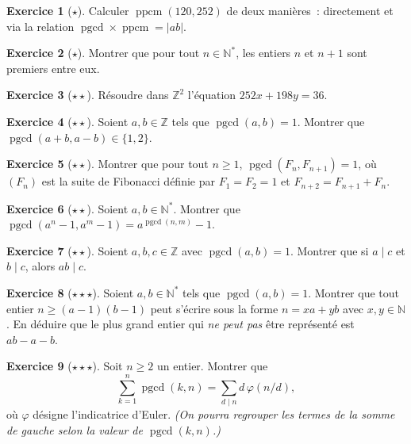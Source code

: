 \documentclass[12pt,a4paper,openany]{book}
\theoremstyle{definition}
\newtheorem{exercice}{Exercice}[chapter]
\theoremstyle{plain}
\theoremstyle{remark}
\newcommand{\N}{\mathbb{N}}
\newcommand{\Z}{\mathbb{Z}}
\newcommand{\abs}[1]{\left|#1\right|}
\DeclareMathOperator{\pgcd}{pgcd}
\DeclareMathOperator{\ppcm}{ppcm}
\begin{document}
\begin{exercice}[$\star$]
\label{exo:ch1:ppcm_calculs}
Calculer $\ppcm(120, 252)$ de deux manières~: directement et via la relation
$\pgcd \times \ppcm = \abs{ab}$.
\end{exercice}

\begin{exercice}[$\star$]
\label{exo:ch1:copremiers}
Montrer que pour tout $n \in \N^*$, les entiers $n$ et $n+1$ sont premiers entre
eux.
\end{exercice}

\begin{exercice}[$\star\star$]
\label{exo:ch1:bezout_equation}
Résoudre dans $\Z^2$ l'équation $252x + 198y = 36$.
\end{exercice}

\begin{exercice}[$\star\star$]
\label{exo:ch1:div_combinaison}
Soient $a, b \in \Z$ tels que $\pgcd(a,b) = 1$. Montrer que
$\pgcd(a+b, a-b) \in \{1, 2\}$.
\end{exercice}

\begin{exercice}[$\star\star$]
\label{exo:ch1:pgcd_fibo}
Montrer que pour tout $n \geq 1$, $\pgcd(F_n, F_{n+1}) = 1$, où $(F_n)$ est la
suite de Fibonacci définie par $F_1 = F_2 = 1$ et
$F_{n+2} = F_{n+1} + F_n$.
\end{exercice}

\begin{exercice}[$\star\star$]
\label{exo:ch1:pgcd_consecutifs}
Soient $a, b \in \N^*$. Montrer que $\pgcd(a^n - 1, a^m - 1) = a^{\pgcd(n,m)} - 1$.
\end{exercice}

\begin{exercice}[$\star\star$]
\label{exo:ch1:gauss_application}
Soient $a, b, c \in \Z$ avec $\pgcd(a,b) = 1$. Montrer que si $a \mid c$ et
$b \mid c$, alors $ab \mid c$.
\end{exercice}

\begin{exercice}[$\star\star\star$]
\label{exo:ch1:olympiade1}
Soient $a, b \in \N^*$ tels que $\pgcd(a,b) = 1$. Montrer que tout entier
$n \geq (a-1)(b-1)$ peut s'écrire sous la forme $n = xa + yb$ avec
$x, y \in \N$. En déduire que le plus grand entier qui \emph{ne peut pas} être
représenté est $ab - a - b$.
\end{exercice}

\begin{exercice}[$\star\star\star$]
\label{exo:ch1:olympiade2}
Soit $n \geq 2$ un entier. Montrer que
\[
  \sum_{k=1}^{n} \pgcd(k, n) = \sum_{d \mid n} d\, \varphi(n/d),
\]
où $\varphi$ désigne l'indicatrice d'Euler. \textit{(On pourra regrouper les termes
de la somme de gauche selon la valeur de $\pgcd(k,n)$.)}
\end{exercice}
\end{document}
